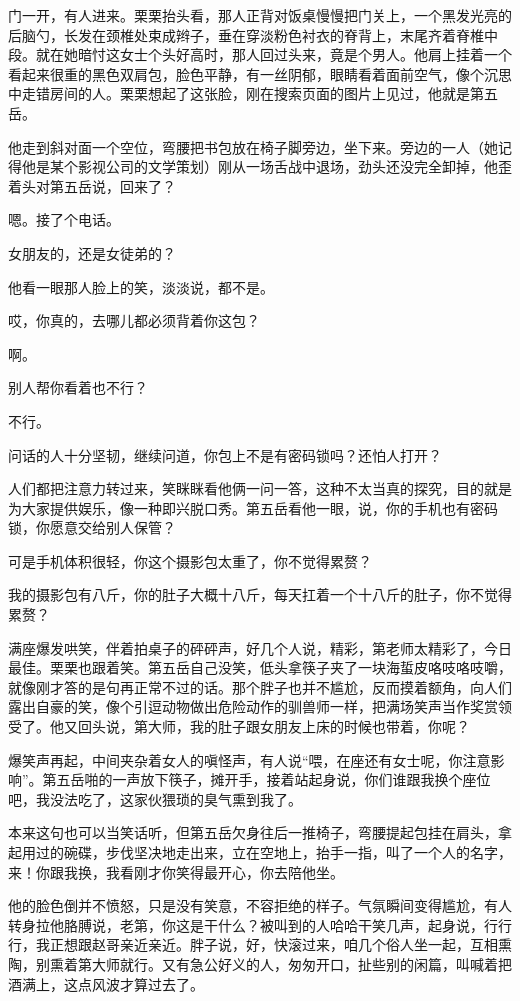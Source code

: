 \documentclass[lang=cn,newtx,12pt,scheme=chinese]{elegantbook}
\begin{document}
门一开，有人进来。栗栗抬头看，那人正背对饭桌慢慢把门关上，一个黑发光亮的后脑勺，长发在颈椎处束成辫子，垂在穿淡粉色衬衣的脊背上，末尾齐着脊椎中段。就在她暗忖这女士个头好高时，那人回过头来，竟是个男人。他肩上挂着一个看起来很重的黑色双肩包，脸色平静，有一丝阴郁，眼睛看着面前空气，像个沉思中走错房间的人。栗栗想起了这张脸，刚在搜索页面的图片上见过，他就是第五岳。

他走到斜对面一个空位，弯腰把书包放在椅子脚旁边，坐下来。旁边的一人（她记得他是某个影视公司的文学策划）刚从一场舌战中退场，劲头还没完全卸掉，他歪着头对第五岳说，回来了？

嗯。接了个电话。

女朋友的，还是女徒弟的？

他看一眼那人脸上的笑，淡淡说，都不是。

哎，你真的，去哪儿都必须背着你这包？

啊。

别人帮你看着也不行？

不行。

问话的人十分坚韧，继续问道，你包上不是有密码锁吗？还怕人打开？

人们都把注意力转过来，笑眯眯看他俩一问一答，这种不太当真的探究，目的就是为大家提供娱乐，像一种即兴脱口秀。第五岳看他一眼，说，你的手机也有密码锁，你愿意交给别人保管？

可是手机体积很轻，你这个摄影包太重了，你不觉得累赘？

我的摄影包有八斤，你的肚子大概十八斤，每天扛着一个十八斤的肚子，你不觉得累赘？

满座爆发哄笑，伴着拍桌子的砰砰声，好几个人说，精彩，第老师太精彩了，今日最佳。栗栗也跟着笑。第五岳自己没笑，低头拿筷子夹了一块海蜇皮咯吱咯吱嚼，就像刚才答的是句再正常不过的话。那个胖子也并不尴尬，反而摸着额角，向人们露出自豪的笑，像个引逗动物做出危险动作的驯兽师一样，把满场笑声当作奖赏领受了。他又回头说，第大师，我的肚子跟女朋友上床的时候也带着，你呢？

爆笑声再起，中间夹杂着女人的嗔怪声，有人说“喂，在座还有女士呢，你注意影响”。第五岳啪的一声放下筷子，摊开手，接着站起身说，你们谁跟我换个座位吧，我没法吃了，这家伙猥琐的臭气熏到我了。

本来这句也可以当笑话听，但第五岳欠身往后一推椅子，弯腰提起包挂在肩头，拿起用过的碗碟，步伐坚决地走出来，立在空地上，抬手一指，叫了一个人的名字，来！你跟我换，我看刚才你笑得最开心，你去陪他坐。

他的脸色倒并不愤怒，只是没有笑意，不容拒绝的样子。气氛瞬间变得尴尬，有人转身拉他胳膊说，老第，你这是干什么？被叫到的人哈哈干笑几声，起身说，行行行，我正想跟赵哥亲近亲近。胖子说，好，快滚过来，咱几个俗人坐一起，互相熏陶，别熏着第大师就行。又有急公好义的人，匆匆开口，扯些别的闲篇，叫喊着把酒满上，这点风波才算过去了。
\end{document}
